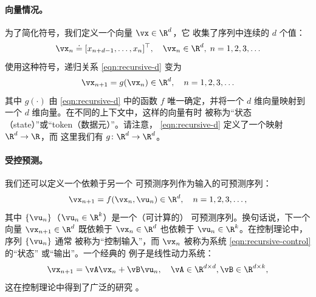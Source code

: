 \documentclass[../../book-main_zh.tex]{subfiles}
\begin{document}
\paragraph{向量情况。}
为了简化符号，我们定义一个向量 \(\vx \in \R^{d}\)，它
收集了序列中连续的 \(d\) 个值：
\begin{equation}
    \vx_{n} \doteq [x_{n+d-1}, \ldots, x_{n}]^{\top}, \quad \vx_{n}
    \in \R^{d}, \; n = 1, 2, 3, \ldots
\end{equation}
使用这种符号，递归关系 \eqref{eqn:recursive-d} 变为
\begin{equation}
    \vx_{n+1} = g(\vx_{n}) \in \R^{d}, \quad n = 1, 2, 3, \ldots
    \label{eqn:recursive-v}
\end{equation}
其中 \(g(\cdot)\) 由 \eqref{eqn:recursive-d} 中的函数 \(f\)
唯一确定，并将一个 \(d\) 维向量映射到一个
\(d\) 维向量。在不同的上下文中，这样的向量有时
被称为“状态（state）”或“token（数据元）”。请注意，
\eqref{eqn:recursive-d} 定义了一个映射 \(\R^{d} \to \R\)，而
这里我们有 \(g \colon \R^{d} \to \R^{d}\)。

\paragraph{受控预测。}
我们还可以定义一个依赖于另一个
可预测序列作为输入的可预测序列：
\begin{equation}
    \vx_{n+1} = f(\vx_{n}, \vu_{n}) \in \R^{d}, \quad n = 1, 2, 3, \ldots,
    \label{eqn:recursive-control}
\end{equation}
其中 \(\{\vu_{n}\}\)（\(\vu_{n} \in \R^{k}\)）是一个（可计算的）
可预测序列。换句话说，下一个向量 \(\vx_{n+1} \in
\R^{d}\) 既依赖于 \(\vx_{n} \in \R^{d}\) 也依赖于 \(\vu_{n} \in
\R^{k}\)。在控制理论中，序列 \(\{\vu_{n}\}\) 通常
被称为“控制输入”，而 \(\vx_{n}\) 被称为系统 \eqref{eqn:recursive-control} 的“状态”
或“输出”。一个经典的
例子是线性动力系统：
\begin{equation}
    \vx_{n+1} = \vA\vx_{n} + \vB\vu_{n}, \quad \vA \in \R^{d \times
    d}, \vB \in \R^{d \times k},
    \label{eqn:lineary-system}
\end{equation}
这在控制理论中得到了广泛的研究 \cite{Cal:Des}。
\end{document}
